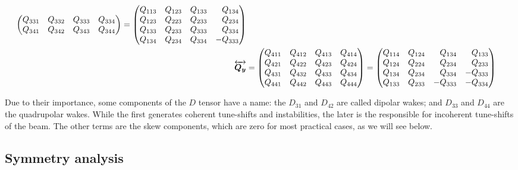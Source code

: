 \begin{align}
\begin{pmatrix*}[r]
                                   Q_{331} & Q_{332} & Q_{333} & Q_{334} \\
                                   Q_{341} & Q_{342} & Q_{343} & Q_{344} 
               \end{pmatrix*} = 
               \begin{pmatrix*}[r] Q_{113} & Q_{123} & Q_{133} & Q_{134} \\
                                   Q_{123} & Q_{223} & Q_{233} & Q_{234} \\
                                   Q_{133} & Q_{233} & Q_{333} & Q_{334} \\
                                   Q_{134} & Q_{234} & Q_{334} & -Q_{333} 
               \end{pmatrix*}\\
\tensor{Q_y}&= \begin{pmatrix*}[r] Q_{411} & Q_{412} & Q_{413} & Q_{414} \\
                                   Q_{421} & Q_{422} & Q_{423} & Q_{424} \\
                                   Q_{431} & Q_{432} & Q_{433} & Q_{434} \\
                                   Q_{441} & Q_{442} & Q_{443} & Q_{444} 
               \end{pmatrix*} = 
               \begin{pmatrix*}[r] Q_{114} & Q_{124} & Q_{134} & Q_{133} \\
                                   Q_{124} & Q_{224} & Q_{234} & Q_{233} \\
                                   Q_{134} & Q_{234} & Q_{334} & -Q_{333} \\
                                   Q_{133} & Q_{233} &-Q_{333} & -Q_{334} 
               \end{pmatrix*}\\
\end{align}



Due to their importance, some components of the $D$ tensor have a name: the $D_{31}$ and $D_{42}$ are called dipolar wakes; and $D_{33}$ and $D_{44}$ are the quadrupolar wakes. While the first generates coherent tune-shifts and instabilities, the later is the responsible for incoherent tune-shifts of the beam. The other terms are the skew components, which are zero for most practical cases, as we will see below.

\subsection{Symmetry analysis}

